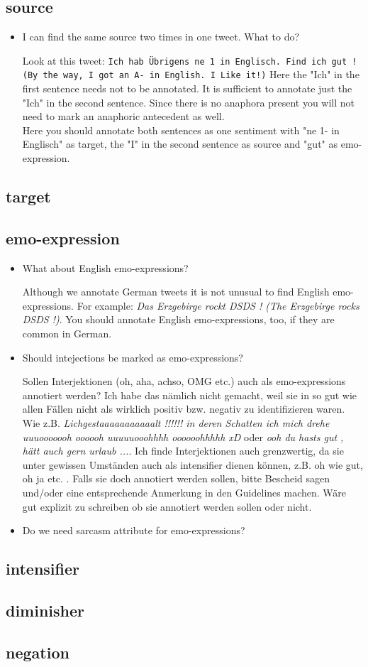 \documentclass[11pt,a4paper]{article}
\begin{document}
\subsection{source}
\begin{itemize}
\item I can find the same source two times in one tweet. What to do?

Look at this tweet: \texttt{Ich hab \"Ubrigens ne 1 in Englisch.  Find
  ich gut ! (By the way, I got an A- in English. I Like it!)}  Here
the "Ich" in the first sentence needs not to be annotated. It is
sufficient to annotate just the "Ich" in the second sentence. Since
there is no anaphora present you will not need to mark an anaphoric
antecedent as well. \\ Here you should annotate both sentences as one
sentiment with "ne 1- in Englisch" as target, the "I" in the second
sentence as source and "gut" as emo-expression.
\end{itemize}

\subsection{target}

\subsection{emo-expression}
\begin{itemize}
\item What about English emo-expressions?

Although we annotate German tweets it is not unusual to find English
emo-expressions. For example: \textit{Das Erzgebirge rockt DSDS ! (The
  Erzgebirge rocks DSDS !)}. You should annotate English
emo-expressions, too, if they are common in German.

\item Should intejections be marked as emo-expressions?

Sollen Interjektionen (oh, aha, achso, OMG etc.) auch als
emo-expressions annotiert werden? Ich habe das n\"amlich nicht
gemacht, weil sie in so gut wie allen F\"allen nicht als wirklich
positiv bzw. negativ zu identifizieren waren. Wie
z.B. \textit{Lichgestaaaaaaaaaaalt !!!!!! in deren Schatten ich mich
  drehe uuuooooooh oooooh uuuuuooohhhh oooooohhhhh xD} oder
\textit{ooh du hasts gut , h\"att auch gern urlaub ...}. Ich finde
Interjektionen auch grenzwertig, da sie unter gewissen Umst\"anden
auch als intensifier dienen k\"onnen, z.B. oh wie gut, oh ja
etc. . Falls sie doch annotiert werden sollen, bitte Bescheid sagen
und/oder eine entsprechende Anmerkung in den Guidelines machen. W\"are
gut explizit zu schreiben ob sie annotiert werden sollen oder nicht.

\item Do we need sarcasm attribute for emo-expressions?
\end{itemize}

\subsection{intensifier}
\subsection{diminisher}
\subsection{negation}
\end{document}
